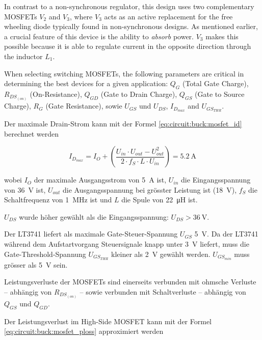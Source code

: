 In contrast to a non-synchronous regulator, this design uses  two  complementary
MOSFETs $V_2$ and $V_3$, where $V_3$ acts as an active replacement for the  free
wheeling diode typically found in non-synchronous designs. As mentioned earlier,
a crucial feature of  this  device  is the ability to \emph{absorb} power. $V_3$
makes  this  possible  because  it  is  able to regulate current in the opposite
direction through the inductor $L_1$.

When  selecting  switching  MOSFETs,  the  following  parameters are critical in
determining the best devices for a given application: $Q_G$ (Total Gate Charge),
$R_{DS_{(on)}}$ (On-Resistance), $Q_{GD}$ (Gate to Drain Charge), $Q_{GS}$ (Gate
to  Source  Charge),  $R_G$  (Gate  Resistance),  sowie  $U_{GS}$  und $U_{DS}$,
$I_{D_{max}}$ and $U_{GS_{THR}}$.

Der  maximale  Drain-Strom  kann mit der Formel  \ref{eq:circuit:buck:mosfet_id}
berechnet werden

\begin{equation}
    I_{D_{max}} = I_O + \left( \frac{U_{in} \cdot U_{out} - U_{out}^2}{2 \cdot f_S \cdot L \cdot U_{in}} \right) = \SI{5.2}{\ampere}
    \label{eq:circuit:buck:mosfet_id}
\end{equation}

wobei $I_O$ der maximale Ausgangsstrom  von  \SI{5}{\ampere}  ist,  $U_{in}$ die
Eingangsspannung von  \SI{36}{\volt}  ist,  $U_{out}$  die  Ausgangsspannung bei
gr\"osster  Leistung  ist   (\SI{18}{\volt}),   $f_S$   die  Schaltfrequenz  von
\SI{1}{\mega\hertz}  ist  und  $L$  die  Spule  von  \SI{22}{\micro\henry}  ist.

$U_{DS}$   wurde   h\"oher  gew\"ahlt  als  die  Eingangsspannung:   $U_{DS}   >
\SI{36}{\volt}$.

Der LT3741 liefert als maximale Gate-Steuer-Spannung $U_{GS}$  \SI{5}{\volt}. Da
der LT3741 w\"ahrend dem Aufstartvorgang Steuersignale knapp unter \SI{3}{\volt}
liefert,   muss   die   Gate-Threshold-Spannung   $U_{GS_{THR}}$   kleiner   als
\SI{2}{\volt} gew\"ahlt werden. $U_{GS_{min}}$ muss gr\"osser  als \SI{5}{\volt}
sein.

Leistungsverluste der MOSFETs sind einerseits verbunden mit ohmsche  Verluste --
abh\"angig  von  $R_{DS_{(on)}}$  --  sowie   verbunden  mit  Schaltverluste  --
abh\"angig von $Q_{GS}$ und $Q_{GD}$.

Der    Leistungsverlust    im    High-Side   MOSFET   kann   mit   der    Formel
\ref{eq:circuit:buck:mosfet_ploss} approximiert werden

